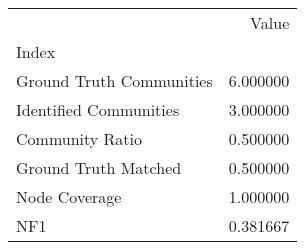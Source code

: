 \begin{tabular}{lr}
\toprule
{} &     Value \\
Index                    &           \\
\midrule
Ground Truth Communities &  6.000000 \\
Identified Communities   &  3.000000 \\
Community Ratio          &  0.500000 \\
Ground Truth Matched     &  0.500000 \\
Node Coverage            &  1.000000 \\
NF1                      &  0.381667 \\
\bottomrule
\end{tabular}
